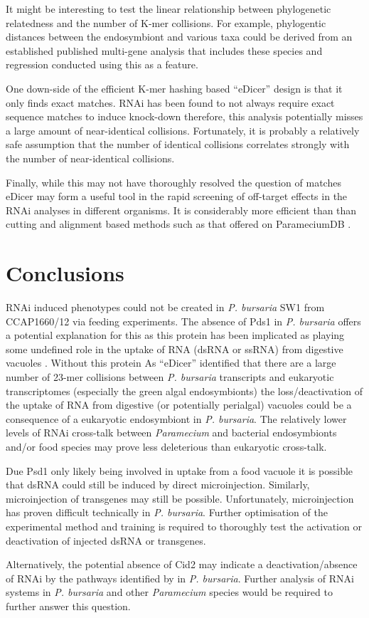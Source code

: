 It might be interesting to test the linear relationship between phylogenetic
relatedness and the number of K-mer collisions.  For example, phylogentic distances
between the endosymbiont and various taxa could be derived from an established
published multi-gene analysis that includes these species and regression
conducted using this as a feature. 

One down-side of the efficient K-mer hashing based ``eDicer'' design is that
it only finds exact matches.  RNAi has been found to not always require exact
sequence matches to induce knock-down \citep{Elbashir2001} therefore,
this analysis potentially misses a large amount of near-identical collisions.
Fortunately, it is probably a relatively safe assumption that the number
of identical collisions correlates strongly with the number of near-identical collisions.

Finally, while this may not have thoroughly resolved the question of matches
eDicer may form a useful tool in the rapid screening of off-target effects
in the RNAi analyses in different organisms.   It is considerably
more efficient than than cutting and alignment based methods such as that
offered on ParameciumDB \citep{Arnaiz2011}.

\section{Conclusions}

RNAi induced phenotypes could not be created in \textit{P. bursaria} SW1 from CCAP1660/12
via feeding experiments.  The absence of Pds1 in \textit{P. bursaria} offers a potential 
explanation for this as this protein has been implicated as playing some undefined role
in the uptake of RNA (dsRNA or ssRNA) from digestive vacuoles \citep{Carradec2015}.
Without this protein 
As ``eDicer'' identified that there are a large number of 23-mer collisions
between \textit{P. bursaria} transcripts and eukaryotic transcriptomes (especially
the green algal endosymbionts) the loss/deactivation of the uptake of RNA from 
digestive (or potentially perialgal) vacuoles could be a consequence of 
a eukaryotic endosymbiont in \textit{P. bursaria}.  
The relatively lower levels of RNAi cross-talk between
\textit{Paramecium} and bacterial endosymbionts and/or food species may prove
less deleterious than eukaryotic cross-talk. 

Due Psd1 only likely being involved in uptake from a food vacuole it is possible
that dsRNA could still be induced by direct microinjection.  Similarly, 
microinjection of transgenes may still be possible.  Unfortunately, microinjection
has proven difficult technically in \textit{P. bursaria}.  Further optimisation
of the experimental method and training is required to thoroughly test
the activation or deactivation of injected dsRNA or transgenes.

Alternatively, the potential absence of Cid2 may indicate a deactivation/absence
of RNAi by the pathways identified by \citep{Marker2014} in \textit{P. bursaria}.
Further analysis of RNAi systems in \textit{P. bursaria} and other \textit{Paramecium}
species would be required to further answer this question.



